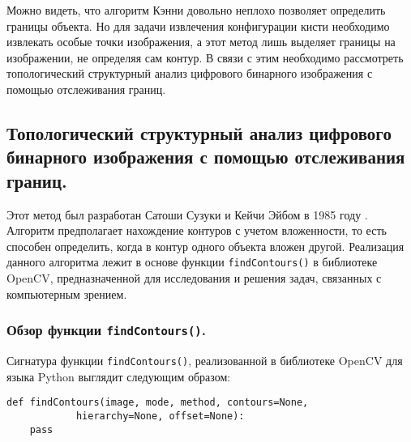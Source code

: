 Можно видеть, что алгоритм Кэнни довольно неплохо позволяет определить
границы объекта. Но для задачи извлечения конфигурации кисти 
необходимо извлекать особые точки изображения, а этот метод лишь 
выделяет границы на изображении, не определяя сам контур. В связи с
этим необходимо рассмотреть топологический структурный анализ цифрового
бинарного изображения с помощью отслеживания границ.

\subsection{Топологический структурный анализ цифрового бинарного
изображения с помощью отслеживания границ.}

Этот метод был разработан Сатоши Сузуки и Кейчи Эйбом в 1985 году
\cite{satoshi}. Алгоритм предполагает нахождение контуров с учетом
вложенности, то есть способен определить, когда в контур одного объекта
вложен другой. Реализация данного алгоритма лежит в основе функции
{\tt findContours()} в библиотеке OpenCV, предназначенной для 
исследования и решения задач, связанных с компьютерным зрением. 

\subsubsection{Обзор функции {\tt findContours()}.}

Сигнатура функции {\tt findContours()}, реализованной в библиотеке
OpenCV для языка Python выглядит следующим образом:

\begin{verbatim}
def findContours(image, mode, method, contours=None, 
			hierarchy=None, offset=None):
	pass
\end{verbatim}

